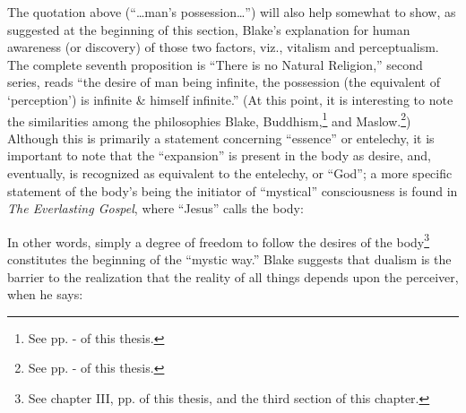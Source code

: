 The quotation above (\enquote{\dots man's possession\dots}) will also help somewhat to show, as suggested at the beginning of this section, Blake's
explanation for human awareness (or discovery) of those two factors, viz., vitalism and perceptualism. The complete seventh proposition is \enquote{There is no Natural Religion,} second
series,\supercite{keynes:william-blake}
reads \enquote{the desire of man being infinite, the possession (the equivalent of \enquote*{perception}) is infinite \& himself infinite.}\supercite{keynes:william-blake}
(At this point, it is interesting to note the similarities among the philosophies
Blake, Buddhism,\footnote{See pp. \pageref{self:01}-\pageref{self:18} of this thesis.} and Maslow.\footnote{See pp. \pageref{self:29}-\pageref{self:30} of this thesis.}) Although this is primarily a statement concerning \enquote{essence} or entelechy, it is important to note
that the \enquote{expansion} is present in the body as desire, and, eventually, is recognized as equivalent to the entelechy, or \enquote{God}; a more specific
statement of the body's being the initiator of \enquote{mystical} consciousness is found in \emph{The Everlasting Gospel}, where \enquote{Jesus} calls the body:



In other words, simply a degree of freedom to follow the desires of the body\footnote{See chapter III, pp. \pageref{self:31} of this thesis, and the third section of this chapter.}
constitutes the beginning of the \enquote{mystic way.}
Blake suggests that dualism is the barrier to the realization that the reality of all things depends upon the perceiver, when he says:

\label{self:22}


